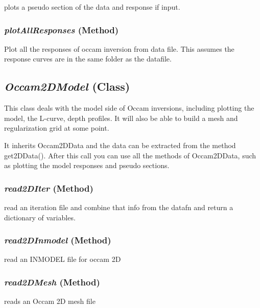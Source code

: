plots a pseudo section of the data and response if input.

\subsubsection{\textit{plotAllResponses} (Method)}
\label{sssec:.modeling.occamtools.Occam2DData.plotAllResponses}


Plot all the responses of occam inversion from data file.  This assumes
        the response curves are in the same folder as the datafile.
    


\subsection{\textit{Occam2DModel} (Class)}
\label{ssec:.modeling.occamtools.Occam2DModel}

This class deals with the model side of Occam inversions, including 
    plotting the model, the L-curve, depth profiles.  It will also be able to 
    build a mesh and regularization grid at some point.  
    
    It inherits Occam2DData and the data can be extracted from the method
    get2DData().  After this call you can use all the methods of Occam2DData,
    such as plotting the model responses and pseudo sections.

\subsubsection{\textit{read2DIter} (Method)}
\label{sssec:.modeling.occamtools.Occam2DModel.read2DIter}

read an iteration file and combine that info from the 
        datafn and return a dictionary of variables.


\subsubsection{\textit{read2DInmodel} (Method)}
\label{sssec:.modeling.occamtools.Occam2DModel.read2DInmodel}

read an INMODEL file for occam 2D

\subsubsection{\textit{read2DMesh} (Method)}
\label{sssec:.modeling.occamtools.Occam2DModel.read2DMesh}

        reads an Occam 2D mesh file
      

